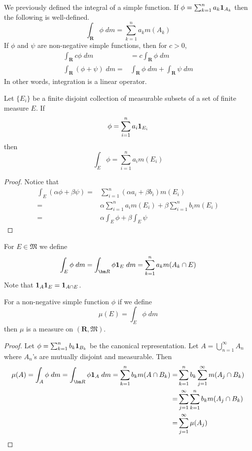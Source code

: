 \vspace{2ex}
\begin{defi}
We previously defined the integral of a simple function. If $\phi =\sum ^{n}_{k=1}a_{k}{\bf 1}_{A_{k}}$ then the following is well-defined.
\[\int _{{\bm R}}\phi \;dm=\sum ^{n}_{k=1}a_{k}m(A_{k})\]
If $\phi $ and $\psi $ are non-negative simple functions, then for $c>0$,
\begin{align*}
\int _{{\bm R}}c\phi \;dm&=c\int _{{\bm R}}\phi \;dm\\
\int _{{\bm R}}(\phi +\psi )\;dm=&\int _{{\bm R}}\phi \;dm+\int _{{\bm R}}\psi  \;dm
\end{align*}
In other words, integration is a linear operator.
\end{defi}
\vspace{2ex}
\begin{lem}
Let $\{E_{i}\}$ be a finite disjoint collection of measurable subsets of a set of finite measure $E$. If
\[\phi =\sum ^{n}_{i=1}a_{i}{\bf 1}_{E_{i}}\]
then
\[\int _{E}\phi =\sum ^{n}_{i=1}a_{i}m(E_{i})\]
\end{lem}
\vspace{2ex}
\begin{proof}
Notice that
\begin{align*}
\int _{E}(\alpha \phi +\beta \psi )=&\sum ^{n}_{i=1}(\alpha a_{i}+\beta b_{i})m(E_{i})\\
=&\alpha \sum ^{n}_{i=1}a_{i} m(E_{i})+\beta \sum ^{n}_{i=1}b_{i} m(E_{i})\\
=&\alpha \int _{E}\phi +\beta \int _{E}\psi 
\end{align*}
\end{proof}
\vspace{2ex}
\begin{defi}
For $E\in \mathfrak{M}$ we define
\[\int _{E}\phi \;dm=\int _{{\bm R}}\phi {\bf 1}_{E}\;dm=\sum ^{n}_{k=1}a_{k}m(A_{k}\cap E)\]
Note that ${\bf 1} _{A}{\bf 1} _{E}={\bf 1}_{A\cap E}$.
\end{defi}
\vspace{2ex}
\begin{thm}
For a non-negative simple function $\phi $ if we define
\[\mu (E)=\int _{E}\phi \; dm\]
then $\mu $ is a measure on $({\bm R},\mathfrak{M})$. 
\end{thm}
\vspace{2ex}
\begin{proof}
Let $\phi =\sum ^{n}_{k=1}b_{k}{\bf 1}_{B_{k}}$ be the canonical representation. Let $A=\bigcup ^{\infty }_{n=1}A_{n}$ where $A_{n}$'s are mutually disjoint and measurable. Then
\begin{align*}
\mu (A)=\int _{A}\phi \; dm=\int _{{\bm R}}\phi {\bf 1} _{A}\; dm=\sum ^{n}_{k=1}b_{k}m(A\cap B_{k})=&\sum ^{n}_{k=1}b_{k}\sum ^{\infty }_{j=1}m(A_{j}\cap B_{k})\\
=&\sum ^{\infty }_{j=1}\sum ^{n}_{k=1}b_{k}m(A_{j}\cap B_{k})\\
=&\sum ^{\infty }_{j=1}\mu (A_{j})
\end{align*}
\end{proof}

